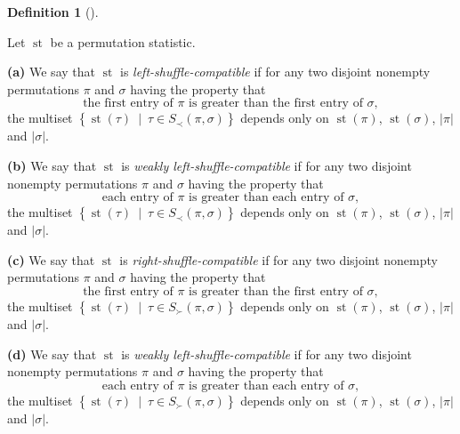 \documentclass[numbers=enddot,12pt,final,onecolumn,notitlepage]{scrartcl}%
\theoremstyle{definition}
\newtheorem{defi}[theo]{Definition}
\newenvironment{definition}[1][]
{\begin{defi}[#1]\begin{leftbar}}
{\end{leftbar}\end{defi}}
\begin{document}
\begin{definition}
Let $\operatorname*{st}$ be a permutation statistic.

\textbf{(a)} We say that $\operatorname*{st}$ is
\textit{left-shuffle-compatible} if for any two disjoint nonempty permutations
$\pi$ and $\sigma$ having the property that%
\begin{equation}
\text{the first entry of }\pi\text{ is greater than the first entry of }%
\sigma, \label{eq.def.dendri.dsc.ass}%
\end{equation}
the multiset $\left\{  \operatorname*{st}\left(  \tau\right)  \ \mid\ \tau\in
S_{\prec}\left(  \pi,\sigma\right)  \right\}  $ depends only on
$\operatorname*{st}\left(  \pi\right)  $, $\operatorname*{st}\left(
\sigma\right)  $, $\left\vert \pi\right\vert $ and $\left\vert \sigma
\right\vert $.

\textbf{(b)} We say that $\operatorname*{st}$ is \textit{weakly
left-shuffle-compatible} if for any two disjoint nonempty permutations $\pi$
and $\sigma$ having the property that%
\begin{equation}
\text{each entry of }\pi\text{ is greater than each entry of }\sigma,
\label{eq.def.dendri.dsc.weak-ass}%
\end{equation}
the multiset $\left\{  \operatorname*{st}\left(  \tau\right)  \ \mid\ \tau\in
S_{\prec}\left(  \pi,\sigma\right)  \right\}  $ depends only on
$\operatorname*{st}\left(  \pi\right)  $, $\operatorname*{st}\left(
\sigma\right)  $, $\left\vert \pi\right\vert $ and $\left\vert \sigma
\right\vert $.

\textbf{(c)} We say that $\operatorname*{st}$ is
\textit{right-shuffle-compatible} if for any two disjoint nonempty
permutations $\pi$ and $\sigma$ having the property that%
\[
\text{the first entry of }\pi\text{ is greater than the first entry of }%
\sigma,
\]
the multiset $\left\{  \operatorname*{st}\left(  \tau\right)  \ \mid\ \tau\in
S_{\succ}\left(  \pi,\sigma\right)  \right\}  $ depends only on
$\operatorname*{st}\left(  \pi\right)  $, $\operatorname*{st}\left(
\sigma\right)  $, $\left\vert \pi\right\vert $ and $\left\vert \sigma
\right\vert $.

\textbf{(d)} We say that $\operatorname*{st}$ is \textit{weakly
left-shuffle-compatible} if for any two disjoint nonempty permutations $\pi$
and $\sigma$ having the property that%
\[
\text{each entry of }\pi\text{ is greater than each entry of }\sigma,
\]
the multiset $\left\{  \operatorname*{st}\left(  \tau\right)  \ \mid\ \tau\in
S_{\succ}\left(  \pi,\sigma\right)  \right\}  $ depends only on
$\operatorname*{st}\left(  \pi\right)  $, $\operatorname*{st}\left(
\sigma\right)  $, $\left\vert \pi\right\vert $ and $\left\vert \sigma
\right\vert $.
\end{definition}
\end{document}
